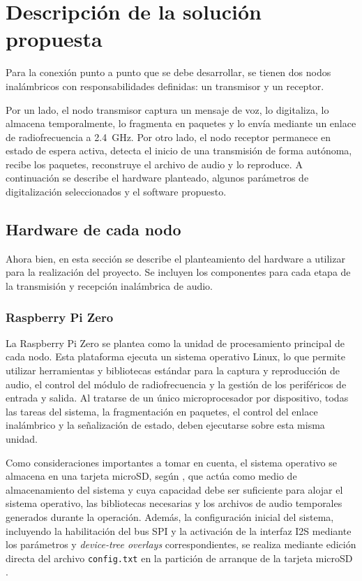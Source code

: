 
\section{Descripción de la solución propuesta}

Para la conexión punto a punto que se debe desarrollar, se tienen dos nodos inalámbricos con responsabilidades definidas: un transmisor y un receptor.

Por un lado, el nodo transmisor captura un mensaje de voz, lo digitaliza, lo almacena temporalmente, lo fragmenta en paquetes y lo envía mediante un enlace de radiofrecuencia a \SI{2.4}{\giga\hertz}.
Por otro lado, el nodo receptor permanece en estado de espera activa, detecta el inicio de una transmisión de forma autónoma, recibe los paquetes, reconstruye el archivo de audio y lo reproduce.
A continuación se describe el hardware planteado, algunos parámetros de digitalización seleccionados y el software propuesto.

\subsection{Hardware de cada nodo}

Ahora bien, en esta sección se describe el planteamiento del hardware a utilizar para la realización del proyecto.
Se incluyen los componentes para cada etapa de la transmisión y recepción inalámbrica de audio.

\subsubsection{Raspberry Pi Zero}

La Raspberry Pi Zero se plantea como la unidad de procesamiento principal de cada nodo.
Esta plataforma ejecuta un sistema operativo Linux, lo que permite utilizar herramientas y bibliotecas estándar para la captura y reproducción de audio, el control del módulo de radiofrecuencia y la gestión de los periféricos de entrada y salida.
Al tratarse de un único microprocesador por dispositivo, todas las tareas del sistema, la fragmentación en paquetes, el control del enlace inalámbrico y la señalización de estado, deben ejecutarse sobre esta misma unidad.

Como consideraciones importantes a tomar en cuenta, el sistema operativo se almacena en una tarjeta microSD, según \cite{adafruit_pizero}, que actúa como medio de almacenamiento del sistema y cuya capacidad debe ser suficiente para alojar el sistema operativo, las bibliotecas necesarias y los archivos de audio temporales generados durante la operación.
Además, la configuración inicial del sistema, incluyendo la habilitación del bus SPI y la activación de la interfaz I2S mediante los parámetros y \textit{device-tree overlays} correspondientes, se realiza mediante edición directa del archivo \texttt{config.txt} en la partición de arranque de la tarjeta microSD \cite{adafruit_pizero}.

